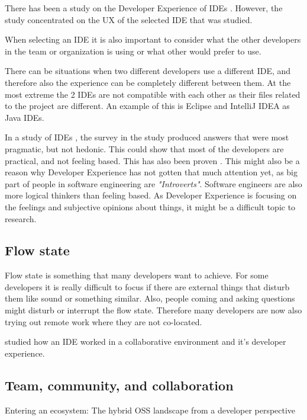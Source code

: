 \documentclass[english, 12pt, a4paper, sci, utf8, a-1b, online]{aaltothesis}
\begin{document}
There has been a study on the Developer Experience of IDEs \cite{software-developers-as-users}. However, the study concentrated on the UX of the selected IDE that was studied.

When selecting an IDE it is also important to consider what the other developers in the team or organization is using or what other would prefer to use.

There can be situations when two different developers use a different IDE, and therefore also the experience can be completely different between them. At the most extreme the 2 IDEs are not compatible with each other as their files related to the project are different. An example of this is Eclipse and IntelliJ IDEA as Java IDEs.

In a study of IDEs \cite{software-developers-as-users}, the survey in the study produced answers that were most pragmatic, but not hedonic. This could show that most of the developers are practical, and not feeling based. This has also been proven \cite{personality-software}. This might also be a reason why Developer Experience has not gotten that much attention yet, as big part of people in software engineering are \textit{"Introverts"}. Software engineers are also more logical thinkers than feeling based. As Developer Experience is focusing on the feelings and subjective opinions about things, it might be a difficult topic to research.

\subsection{Flow state}

Flow state is something that many developers want to achieve. For some developers it is really difficult to focus if there are external things that disturb them like sound or something similar. Also, people coming and asking questions might disturb or interrupt the flow state. Therefore many developers are now also trying out remote work where they are not co-located.

\cite{design-framework-enchancing} studied how an IDE worked in a collaborative environment and it's developer experience.

\subsection{Team, community, and collaboration}

{\color{gray} Entering an ecosystem: The hybrid OSS landscape from a developer perspective}
\end{document}
